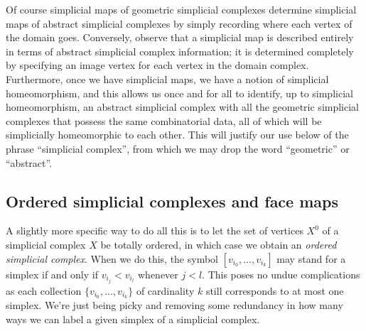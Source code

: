 \documentclass[12pt]{article}
\theoremstyle{plain}
\theoremstyle{definition}
\begin{document}
Of course simplicial maps of geometric simplicial complexes determine simplicial maps of abstract simplicial complexes by simply recording where each vertex of the domain goes. Conversely, observe that a simplicial map is described entirely in terms of abstract simplicial complex information; it is determined completely by specifying an image vertex for each vertex in the domain complex. Furthermore, once we have simplicial maps, we have a notion of simplicial homeomorphism, and this allows us once and for all to identify, up to simplicial homeomorphism, an abstract simplicial complex with all the geometric simplicial complexes that possess the same combinatorial data, all of which will be simplicially homeomorphic to each other. This will justify our use below of the phrase ``simplicial complex'', from which we may drop the word ``geometric'' or ``abstract''. 













\subsection{Ordered simplicial complexes and face maps}


A slightly more specific way to do all this is to let the set of vertices $X^0$ of a simplicial complex $X$ be totally ordered, in which case we obtain an \emph{ordered simplicial complex}. When we do this, the symbol $[v_{i_0},\ldots, v_{i_k}]$ may stand for a simplex if and only if $v_{i_j}<v_{i_{l}}$ whenever $j<l$. This poses no undue complications as each collection $\{v_{i_0},\ldots, v_{i_k}\}$ of cardinality $k$ still corresponds to at most one simplex. We're just being picky and removing some redundancy in how many ways we can label a given simplex of a simplicial complex.
\end{document}
